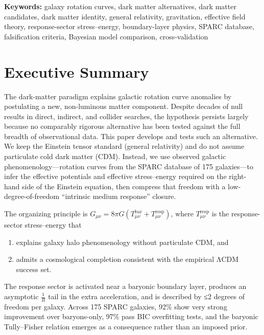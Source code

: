 \documentclass[11pt]{article}
\begin{document}
\noindent\textbf{Keywords:} galaxy rotation curves, dark matter alternatives, dark matter candidates, dark matter identity, general relativity, gravitation, effective field theory, response-sector stress--energy, boundary-layer physics, SPARC database, falsification criteria, Bayesian model comparison, cross-validation

\section*{Executive Summary}

The dark-matter paradigm explains galactic rotation curve anomalies by postulating a new, non-luminous matter component. Despite decades of null results in direct, indirect, and collider searches, the hypothesis persists largely because no comparably rigorous alternative has been tested against the full breadth of observational data. This paper develops and tests such an alternative. We keep the Einstein tensor standard (general relativity) and do not assume particulate cold dark matter (CDM). Instead, we use observed galactic phenomenology---rotation curves from the SPARC database of 175 galaxies---to infer the effective potentials and effective stress--energy required on the right-hand side of the Einstein equation, then compress that freedom with a low-degree-of-freedom ``intrinsic medium response'' closure.

The organizing principle is \(G_{\mu\nu} = 8\pi G\left( T_{\mu\nu}^{\text{bar}} + T_{\mu\nu}^{\text{resp}} \right)\), where \(T_{\mu\nu}^{\text{resp}}\) is the response-sector stress--energy that

\begin{enumerate}
\def\labelenumi{(\roman{enumi})}
\item
  explains galaxy halo phenomenology without particulate CDM, and
\item
  admits a cosmological completion consistent with the empirical ΛCDM success set.
\end{enumerate}

The response sector is activated near a baryonic boundary layer, produces an asymptotic \(\frac{1}{R}\) tail in the extra acceleration, and is described by ≤2 degrees of freedom per galaxy. Across 175 SPARC galaxies, 92\% show very strong improvement over baryons-only, 97\% pass BIC overfitting tests, and the baryonic Tully--Fisher relation emerges as a consequence rather than an imposed prior.
\end{document}
